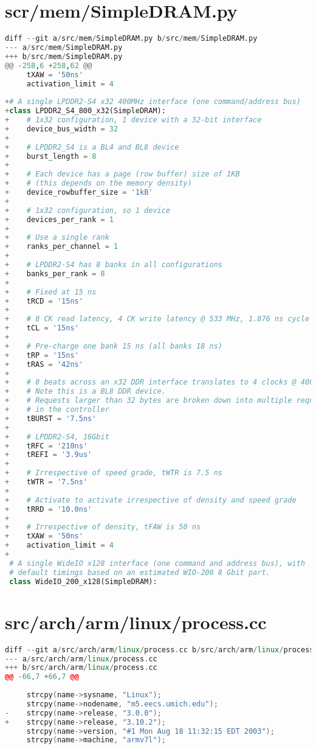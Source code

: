 \section{scr/mem/SimpleDRAM.py}
\label{gem5simpledram}
\begin{lstlisting}[language=python,basicstyle=\tiny,numberstyle=\tiny]
diff --git a/src/mem/SimpleDRAM.py b/src/mem/SimpleDRAM.py
--- a/src/mem/SimpleDRAM.py
+++ b/src/mem/SimpleDRAM.py
@@ -258,6 +258,62 @@
     tXAW = '50ns'
     activation_limit = 4
 
+# A single LPDDR2-S4 x32 400MHz interface (one command/address bus)
+class LPDDR2_S4_800_x32(SimpleDRAM):
+    # 1x32 configuration, 1 device with a 32-bit interface
+    device_bus_width = 32
+
+    # LPDDR2_S4 is a BL4 and BL8 device
+    burst_length = 8
+
+    # Each device has a page (row buffer) size of 1KB
+    # (this depends on the memory density)
+    device_rowbuffer_size = '1kB'
+
+    # 1x32 configuration, so 1 device
+    devices_per_rank = 1
+
+    # Use a single rank
+    ranks_per_channel = 1
+
+    # LPDDR2-S4 has 8 banks in all configurations
+    banks_per_rank = 8
+
+    # Fixed at 15 ns
+    tRCD = '15ns'
+
+    # 8 CK read latency, 4 CK write latency @ 533 MHz, 1.876 ns cycle time
+    tCL = '15ns'
+
+    # Pre-charge one bank 15 ns (all banks 18 ns)
+    tRP = '15ns'
+    tRAS = '42ns'
+
+    # 8 beats across an x32 DDR interface translates to 4 clocks @ 400 MHz.
+    # Note this is a BL8 DDR device.
+    # Requests larger than 32 bytes are broken down into multiple requests
+    # in the controller
+    tBURST = '7.5ns'
+
+    # LPDDR2-S4, 16Gbit
+    tRFC = '210ns'
+    tREFI = '3.9us'
+
+    # Irrespective of speed grade, tWTR is 7.5 ns
+    tWTR = '7.5ns'
+
+    # Activate to activate irrespective of density and speed grade
+    tRRD = '10.0ns'
+
+    # Irrespective of density, tFAW is 50 ns
+    tXAW = '50ns'
+    activation_limit = 4
+
 # A single WideIO x128 interface (one command and address bus), with
 # default timings based on an estimated WIO-200 8 Gbit part.
 class WideIO_200_x128(SimpleDRAM):
\end{lstlisting}
\vfill

\section{src/arch/arm/linux/process.cc}
\begin{lstlisting}[language=C++]
diff --git a/src/arch/arm/linux/process.cc b/src/arch/arm/linux/process.cc
--- a/src/arch/arm/linux/process.cc
+++ b/src/arch/arm/linux/process.cc
@@ -66,7 +66,7 @@
 
     strcpy(name->sysname, "Linux");
     strcpy(name->nodename, "m5.eecs.umich.edu");
-    strcpy(name->release, "3.0.0");
+    strcpy(name->release, "3.10.2");
     strcpy(name->version, "#1 Mon Aug 18 11:32:15 EDT 2003");
     strcpy(name->machine, "armv7l");
\end{lstlisting}
\vfill
